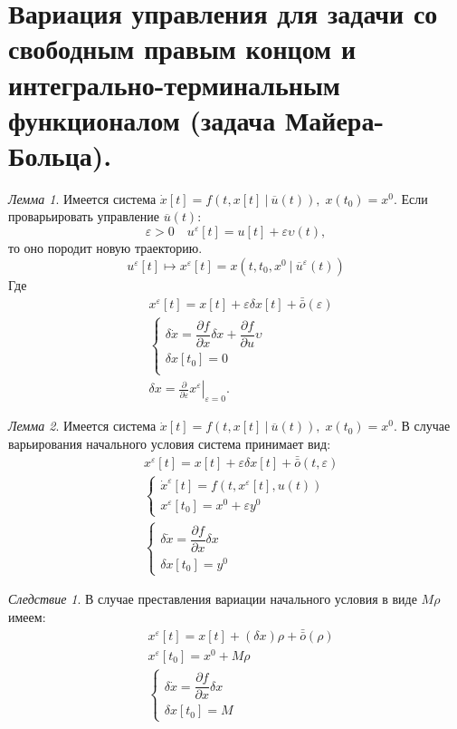 \documentclass[oneside, final, 14pt, draft]{article}
\theoremstyle{definition}
\theoremstyle{definition}
\theoremstyle{remark}
\theoremstyle{theorem}
\newtheorem{lem}{Лемма}[section]
\newtheorem{nxt}{Следствие}[section]
\begin{document}
\section{Вариация управления для задачи со свободным правым концом и интегрально-терминальным функционалом (задача Майера-Больца).}
\begin{lem} Имеется система $\dot{x} [t] = f (t, x[t]\ |\ \overline{u}(t)),\;x(t_0) = x^0$. Если проварьировать управление $\overline{u}(t)\colon$
$$\varepsilon > 0 \quad u^\varepsilon [t] = u[t] + \varepsilon \upsilon(t),$$
то оно породит новую траекторию.
$$u^\varepsilon [t] \mapsto x^\varepsilon [t] = x (t, t_0, x^0\ |\ \overline{u}^\varepsilon(t))$$
Где
\begin{align*}
&x^\varepsilon [t] = x[t] + \varepsilon \delta x[t] + \bar{\bar{o}}(\varepsilon)\\
&\begin{cases}
\delta \dot{x} = \dfrac{\partial f}{\partial x} \delta x + \dfrac{\partial f}{\partial u}\upsilon\\
\delta x[t_0]  = 0\\
\end{cases}\\
&\delta x = \left.\frac{\partial}{\partial \varepsilon} x^\varepsilon\right|_{\varepsilon = 0}.
\end{align*}
\end{lem}

\begin{lem}  Имеется система $\dot{x} [t] = f (t, x[t]\ |\ \overline{u}(t)),\;x(t_0) = x^0$. В случае варьирования начального условия система принимает вид: 
\begin{align*}
&x^\varepsilon[t] = x[t] + \varepsilon \delta x[t] + \bar{\bar{o}}(t, \varepsilon)\\
&\begin{cases}
\dot{x}^\varepsilon [t] = f (t, x^\varepsilon[t], u(t))\\
x^\varepsilon[t_0] = x^0 + \varepsilon y^0
\end{cases}\\
&\begin{cases}
\delta \dot{x} = \dfrac{\partial f}{\partial x} \delta x\\
\delta x[t_0] = y^0
\end{cases}
\end{align*}
\end{lem}

\begin{nxt} В случае преставления вариации начального условия в виде $M\rho$ имеем:
\begin{align*}
&x^\varepsilon[t] = x[t] + (\delta x)\rho +  \bar{\bar{o}}(\rho)\\
&x^\varepsilon[t_0] = x^0 + M\rho\\
&\begin{cases}
\delta \dot{x} = \dfrac{\partial f}{\partial x} \delta x\\
\delta x[t_0] = M
\end{cases}
\end{align*}
\end{nxt}
\end{document}
